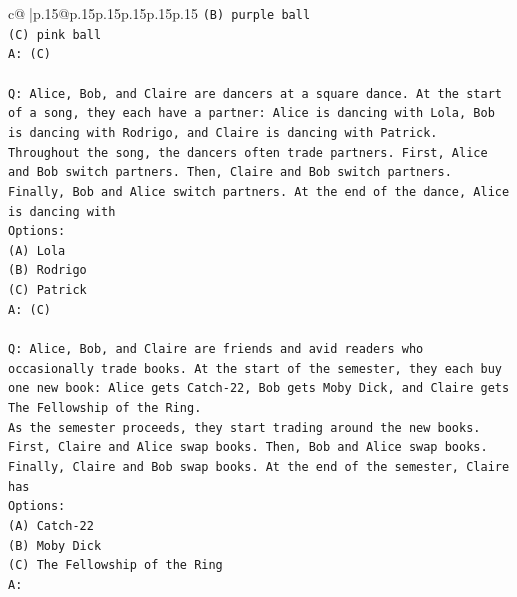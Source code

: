 \documentclass{article}
\begin{document}
{\begin{supertabular}{c@{$\;$}|p{.15\linewidth}@{}p{.15\linewidth}p{.15\linewidth}p{.15\linewidth}p{.15\linewidth}p{.15\linewidth}}
{{{\texttt{(B) purple ball} \\
\texttt{(C) pink ball} \\
\texttt{A: (C)} \\
\\ 
\texttt{Q: Alice, Bob, and Claire are dancers at a square dance. At the start of a song, they each have a partner: Alice is dancing with Lola, Bob is dancing with Rodrigo, and Claire is dancing with Patrick.} \\
\texttt{Throughout the song, the dancers often trade partners. First, Alice and Bob switch partners. Then, Claire and Bob switch partners. Finally, Bob and Alice switch partners. At the end of the dance, Alice is dancing with} \\
\texttt{Options:} \\
\texttt{(A) Lola} \\
\texttt{(B) Rodrigo} \\
\texttt{(C) Patrick} \\
\texttt{A: (C)} \\
\\ 
\texttt{Q: Alice, Bob, and Claire are friends and avid readers who occasionally trade books. At the start of the semester, they each buy one new book: Alice gets Catch{-}22, Bob gets Moby Dick, and Claire gets The Fellowship of the Ring.} \\
\texttt{As the semester proceeds, they start trading around the new books. First, Claire and Alice swap books. Then, Bob and Alice swap books. Finally, Claire and Bob swap books. At the end of the semester, Claire has} \\
\texttt{Options:} \\
\texttt{(A) Catch{-}22} \\
\texttt{(B) Moby Dick} \\
\texttt{(C) The Fellowship of the Ring} \\
\texttt{A:} \\
            }
        }
    }
     \\ \\


\end{supertabular}}
\end{document}
